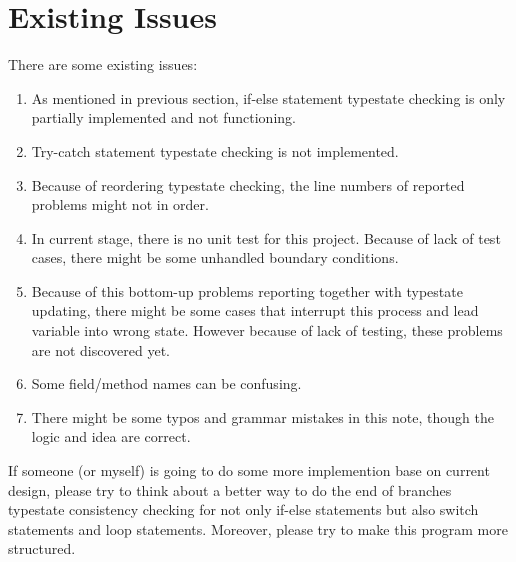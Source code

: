 \documentclass[]{article}
\begin{document}
\section{Existing Issues}
There are some existing issues:
\begin{enumerate}
	\item As mentioned in previous section, if-else statement typestate checking is only partially implemented and not functioning.
	\item Try-catch statement typestate checking is not implemented.
	\item Because of reordering typestate checking, the line numbers of reported problems might not in order.
	\item In current stage, there is no unit test for this project. Because of lack of test cases, there might be some unhandled boundary conditions. 
	\item Because of this bottom-up problems reporting together with typestate updating, there might be some cases that interrupt this process and lead variable into wrong state. However because of lack of testing, these problems are not discovered yet.
	\item Some field/method names can be confusing.
	\item There might be some typos and grammar mistakes in this note, though the logic and idea are correct.
\end{enumerate}
If someone (or myself) is going to do some more implemention base on current design, please try to think about a better way to do the end of branches typestate consistency checking for not only if-else statements but also switch statements and loop statements. Moreover, please try to make this program more structured. \\[0.2cm]





%
\end{document}
